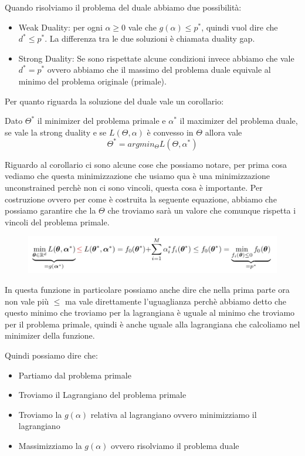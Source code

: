 \documentclass[14pt]{extreport}
\begin{document}
Quando risolviamo il problema del duale abbiamo due possibilità:

\begin{itemize}
\item Weak Duality: per ogni $\alpha \geq 0$ vale che $g(\alpha) \leq p^*$, quindi vuol dire che $d^* \leq p^*$. La differenza tra le due soluzioni è
chiamata duality gap.
\item Strong Duality: Se sono rispettate alcune condizioni invece abbiamo che vale $d^* = p^*$ ovvero abbiamo che il massimo del problema duale
equivale al minimo del problema originale (primale).
\end{itemize}

Per quanto riguarda la soluzione del duale vale un corollario: 

Dato $\Theta^*$ il minimizer del problema primale e $\alpha^*$ il maximizer del problema duale, se vale la strong duality e se $L(\Theta, \alpha)$ è
convesso in $\Theta$ allora vale $$\Theta^* = argmin_\Theta L(\Theta, \alpha^*)$$

Riguardo al corollario ci sono alcune cose che possiamo notare, per prima cosa vediamo che questa minimizzazione che usiamo qua è una minimizzazione
unconstrained perchè non ci sono vincoli, questa cosa è importante. Per costruzione ovvero per come è costruita la seguente equazione, abbiamo che
possiamo garantire che la $\Theta$ che troviamo sarà un valore che comunque rispetta i vincoli del problema primale.

\begin{figure}[H]
\centering
\includegraphics[width=0.8\linewidth]{308.jpeg}
\end{figure}

In questa funzione in particolare possiamo anche dire che nella prima parte ora non vale più $\leq$ ma vale direttamente l'uguaglianza perchè abbiamo
detto che questo minimo che troviamo per la lagrangiana è uguale al minimo che troviamo per il problema primale, quindi è anche uguale alla
lagrangiana che calcoliamo nel minimizer della funzione.


Quindi possiamo dire che:

\begin{itemize}
\item Partiamo dal problema primale
\item Troviamo il Lagrangiano del problema primale
\item Troviamo la $g(\alpha)$ relativa al lagrangiano ovvero minimizziamo il lagrangiano
\item Massimizziamo la $g(\alpha)$ ovvero risolviamo il problema duale
\end{itemize}
\end{document}
